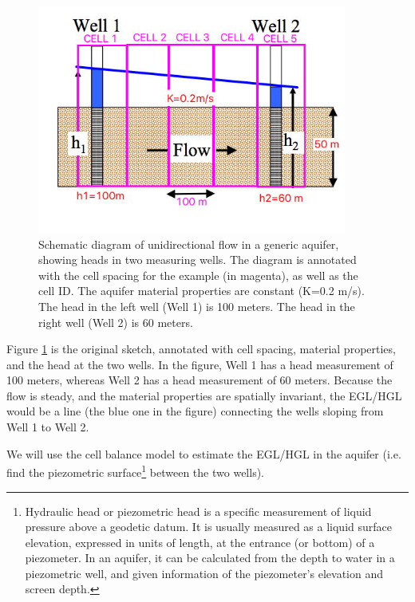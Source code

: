\begin{figure}[h!] %
   \centering
   \includegraphics[width=4in]{./17-SteadyGroundwaterFlow/1D-aquifer-flow-fdm.jpg} 
   \caption{Schematic diagram of unidirectional flow in a generic aquifer, showing heads in two measuring wells.  The diagram is annotated with the cell spacing for the example (in magenta), as well as the cell ID.  The aquifer material properties are constant (K=0.2 m/s).   The head in the left well (Well 1) is 100 meters.   The head in the right well (Well 2) is 60 meters.}
   \label{fig:1D-aquifer-flow-fdm}
\end{figure}

Figure \ref{fig:1D-aquifer-flow-fdm} is the original sketch, annotated with cell spacing, material properties, and the head at the two wells.  In the figure, Well 1 has a head measurement of 100 meters, whereas Well 2 has a head measurement of 60 meters.  Because the flow is steady, and the material properties are spatially invariant, the EGL/HGL would be a line (the blue one in the figure) connecting the wells sloping from Well 1 to Well 2.

We will use the cell balance model to estimate the EGL/HGL in the aquifer (i.e. find the piezometric surface\footnote{Hydraulic head or piezometric head is a specific measurement of liquid pressure above a geodetic datum. It is usually measured as a liquid surface elevation, expressed in units of length, at the entrance (or bottom) of a piezometer. In an aquifer, it can be calculated from the depth to water in a piezometric well, and given information of the piezometer's elevation and screen depth.} between the two wells).

